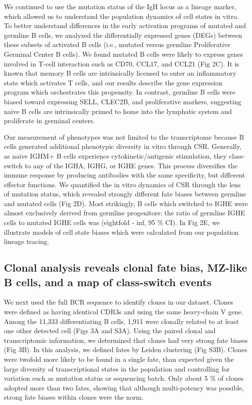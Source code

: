 We continued to use the mutation status of the IgH locus as a lineage marker, which allowed us to understand the population dynamics of cell states in vitro. To better understand differences in the early activation programs of mutated and germline B cells, we analyzed the differentially expressed genes (DEGs) between these subsets of activated B cells (i.e., mutated versus germline Proliferative Germinal Center B cells). We found mutated B cells were likely to express genes involved in T-cell interaction such as CD70, CCL17, and CCL21 (Fig 2C). It is known that memory B cells are intrinsically licensed to enter an inflammatory state which activates T cells\cite{liu_memory_1995, good_resting_2009}, and our results describe the gene expression program which orchestrates this propensity. In contrast, germline B cells were biased toward expressing SELL, CLEC2B, and proliferative markers, suggesting naive B cells are intrinsically primed to home into the lymphatic system and proliferate in germinal centers.

Our measurement of phenotypes was not limited to the transcriptome because B cells generated additional phenotypic diversity in vitro through CSR. Generally, as naive IGHM+ B cells experience cytokinetic/antigenic stimulation, they class-switch to any of the IGHA, IGHG, or IGHE genes. This process diversifies the immune response by producing antibodies with the same specificity, but different effector functions. We quantified the in vitro dynamics of CSR through the lens of mutation status, which revealed strongly different fate biases between germline and mutated cells (Fig 2D). Most strikingly, B cells which switched to IGHE were almost exclusively derived from germline progenitors: the ratio of germline IGHE cells to mutated IGHE cells was (eightfold - inf, 95 \% CI). In Fig 2E, we illustrate models of cell state biases which were calculated from our population lineage tracing.

\subsection{Clonal analysis reveals clonal fate bias, MZ-like B cells, and a map of class-switch events
}
We next used the full BCR sequence to identify clones in our dataset. Clones were defined as having identical CDR3s and using the same heavy-chain V gene. Among the 11,333 differentiating B cells, 1,911 were clonally related to at least one other detected cell (Figs 3A and S3A). Using the paired clonal and transcriptomic information, we determined that clones had very strong fate biases (Fig 3B). In this analysis, we defined fates by Leiden clustering (Fig S3B). Clones were twofold more likely to be found in a single fate, than expected given the large diversity of transcriptional states in the population and controlling for variation such as mutation status or sequencing batch. Only about 5 \% of clones adopted more than two fates, showing that although multi-potency was possible, strong fate biases within clones were the norm.

